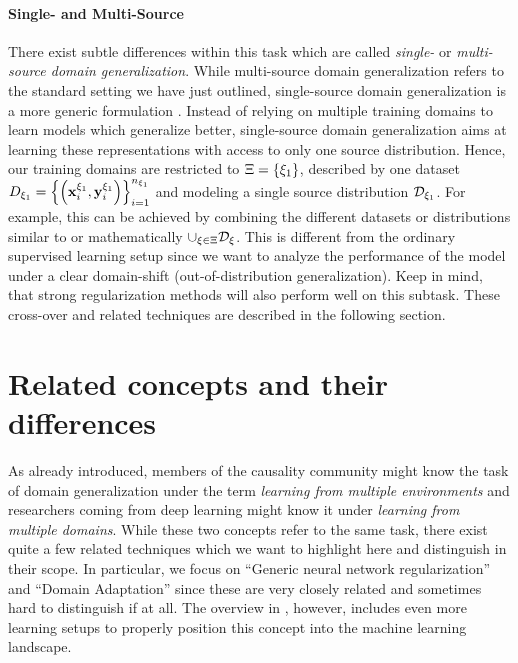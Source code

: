 \paragraph{Single- and Multi-Source}
There exist subtle differences within this task which are called \emph{single-} or \emph{multi-source domain generalization}. While multi-source domain generalization refers to the standard setting we have just outlined, single-source domain generalization is a more generic formulation \citep{zunino2020explainable}. Instead of relying on multiple training domains to learn models which generalize better, single-source domain generalization aims at learning these representations with access to only one source distribution. Hence, our training domains are restricted to $\Xi = \left\{\xi_1\right\}$, described by one dataset $D_{\xi_1}=\left\{\left(\mathbf{x}_i^{\xi_1}, \mathbf{y}_i^{\xi_1}\right)\right\}_{i=1}^{n_{\xi_1}}$ and modeling a single source distribution $\mathcal{D}_{\xi_1}$. For example, this can be achieved by combining the different datasets or distributions similar to  or mathematically $\cup_{\xi \in \Xi} \mathcal{D}_\xi$. This is different from the ordinary supervised learning setup since we want to analyze the performance of the model under a clear domain-shift (\ie out-of-distribution generalization). Keep in mind, that strong regularization methods will also perform well on this subtask. These cross-over and related techniques are described in the following section.

\section{Related concepts and their differences}

As already introduced, members of the causality community might know the task of domain generalization under the term \emph{learning from multiple environments} \citep{arjovsky2019invariant, gulrajani2020search, PetBuhMei15} and researchers coming from deep learning might know it under \emph{learning from multiple domains}. While these two concepts refer to the same task, there exist quite a few related techniques which we want to highlight here and distinguish in their scope. In particular, we focus on ``Generic neural network regularization'' and ``Domain Adaptation'' since these are very closely related and sometimes hard to distinguish if at all. The overview in , however, includes even more learning setups to properly position this concept into the machine learning landscape.

